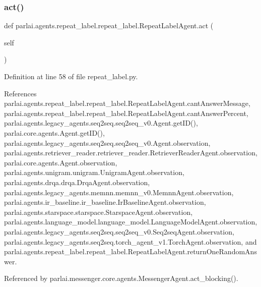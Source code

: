 \subsubsection{\texorpdfstring{act()}{act()}}
{\footnotesize\ttfamily def parlai.\+agents.\+repeat\+\_\+label.\+repeat\+\_\+label.\+Repeat\+Label\+Agent.\+act (\begin{DoxyParamCaption}\item[{}]{self }\end{DoxyParamCaption})}



Definition at line 58 of file repeat\+\_\+label.\+py.



References parlai.\+agents.\+repeat\+\_\+label.\+repeat\+\_\+label.\+Repeat\+Label\+Agent.\+cant\+Answer\+Message, parlai.\+agents.\+repeat\+\_\+label.\+repeat\+\_\+label.\+Repeat\+Label\+Agent.\+cant\+Answer\+Percent, parlai.\+agents.\+legacy\+\_\+agents.\+seq2seq.\+seq2seq\+\_\+v0.\+Agent.\+get\+I\+D(), parlai.\+core.\+agents.\+Agent.\+get\+I\+D(), parlai.\+agents.\+legacy\+\_\+agents.\+seq2seq.\+seq2seq\+\_\+v0.\+Agent.\+observation, parlai.\+agents.\+retriever\+\_\+reader.\+retriever\+\_\+reader.\+Retriever\+Reader\+Agent.\+observation, parlai.\+core.\+agents.\+Agent.\+observation, parlai.\+agents.\+unigram.\+unigram.\+Unigram\+Agent.\+observation, parlai.\+agents.\+drqa.\+drqa.\+Drqa\+Agent.\+observation, parlai.\+agents.\+legacy\+\_\+agents.\+memnn.\+memnn\+\_\+v0.\+Memnn\+Agent.\+observation, parlai.\+agents.\+ir\+\_\+baseline.\+ir\+\_\+baseline.\+Ir\+Baseline\+Agent.\+observation, parlai.\+agents.\+starspace.\+starspace.\+Starspace\+Agent.\+observation, parlai.\+agents.\+language\+\_\+model.\+language\+\_\+model.\+Language\+Model\+Agent.\+observation, parlai.\+agents.\+legacy\+\_\+agents.\+seq2seq.\+seq2seq\+\_\+v0.\+Seq2seq\+Agent.\+observation, parlai.\+agents.\+legacy\+\_\+agents.\+seq2seq.\+torch\+\_\+agent\+\_\+v1.\+Torch\+Agent.\+observation, and parlai.\+agents.\+repeat\+\_\+label.\+repeat\+\_\+label.\+Repeat\+Label\+Agent.\+return\+One\+Random\+Answer.



Referenced by parlai.\+messenger.\+core.\+agents.\+Messenger\+Agent.\+act\+\_\+blocking().

